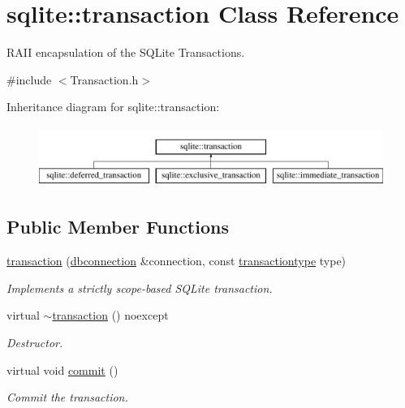 \hypertarget{a00014}{\section{sqlite\-:\-:transaction Class Reference}
\label{a00014}
}


R\-A\-I\-I encapsulation of the S\-Q\-Lite Transactions.  




{\ttfamily \#include $<$Transaction.\-h$>$}

Inheritance diagram for sqlite\-:\-:transaction\-:\begin{figure}[H]
\begin{center}
\leavevmode
\includegraphics[height=2.000000cm]{a00014}
\end{center}
\end{figure}
\subsection*{Public Member Functions}
\begin{DoxyCompactItemize}
\item 
\hyperlink{a00014_a68948311add43f7269d4bb588e40458b}{transaction} (\hyperlink{a00004}{dbconnection} \&connection, const \hyperlink{a00038_a6b830ddde90f9bf8b2b59b395a66ceb8}{transactiontype} type)
\begin{DoxyCompactList}\small\item\em Implements a strictly scope-\/based S\-Q\-Lite transaction. \end{DoxyCompactList}\item 
virtual \hyperlink{a00014_a798101cf276674d19708c1958e5b03fb}{$\sim$transaction} () noexcept
\begin{DoxyCompactList}\small\item\em Destructor. \end{DoxyCompactList}\item 
\hypertarget{a00014_abe219dd0bf949d569381f9830c7b2d1a}{virtual void \hyperlink{a00014_abe219dd0bf949d569381f9830c7b2d1a}{commit} ()}\label{a00014_abe219dd0bf949d569381f9830c7b2d1a}

\begin{DoxyCompactList}\small\item\em Commit the transaction. \end{DoxyCompactList}\end{DoxyCompactItemize}


